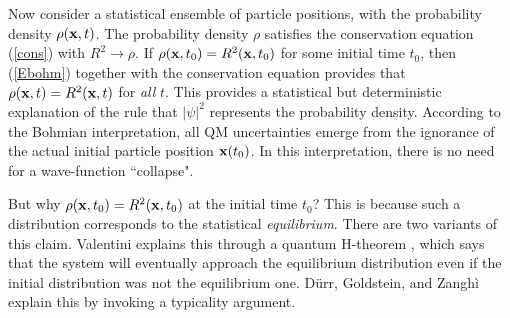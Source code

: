 \documentclass[10pt,twoside]{aipproc} %
\begin{document}
Now consider a statistical ensemble of particle positions, with the 
probability density $\rho({\bf x},t)$. 
The probability density $\rho$ 
satisfies the conservation equation (\ref{cons}) 
with $R^2\rightarrow\rho$. 
If $\rho({\bf x},t_0)=R^2({\bf x},t_0)$ for some initial time $t_0$, 
then (\ref{Ebohm}) together with the conservation equation provides that
$\rho({\bf x},t)=R^2({\bf x},t)$ for {\em all} $t$. 
This provides a statistical but deterministic explanation of the 
rule that $|\psi|^2$ represents the probability density. 
According to the Bohmian interpretation, all  
QM uncertainties
emerge from the ignorance of the actual initial particle position
${\bf x}(t_0)$. In this interpretation, 
there is no need for a wave-function ``collapse". 
 
But why $\rho({\bf x},t_0)=R^2({\bf x},t_0)$ at the initial time $t_0$?
This is because such a distribution  
corresponds to the statistical {\em equilibrium}. 
There are two variants of this claim.  
Valentini explains this through a quantum H-theorem \cite{val}, 
which says that the system will eventually approach the equilibrium 
distribution even if the initial distribution was not the 
equilibrium one.   
D\"urr, Goldstein, and Zangh\`i \cite{durr1,durr2} explain this by invoking 
a typicality argument. 
\end{document}
